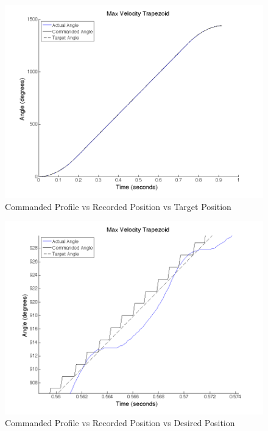 \documentclass{article}
\theoremstyle{plain}
\theoremstyle{definition}
\theoremstyle{remark}
\begin{document}
\begin{figure}[hbt]
\begin{center}
\includegraphics[width = 12cm]{4cProfile.png}
\caption{Commanded Profile vs Recorded Position vs Target Position}
\label{Q4c_Profile}
\end{center}
\end{figure}

\begin{figure}[hbt]
\begin{center}
\includegraphics[width = 12cm]{4cProfileDetail1.png}
\caption{Commanded Profile vs Recorded Position vs Desired Position}
\label{Q4c_ProfileDetail}
\end{center}
\end{figure}
\end{document}
